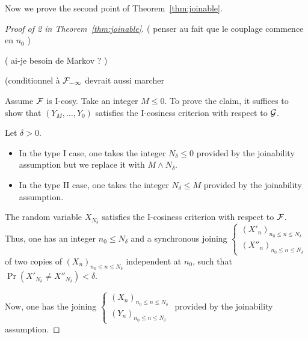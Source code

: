 \documentclass[12pt,a4paper]{article}
\begin{document}
Now we prove the second point of Theorem~\ref{thm:joinable}.

\begin{proof}[Proof of 2 in Theorem~\ref{thm:joinable}]

( penser au fait que le couplage commence en $n_0$ )

( ai-je besoin de Markov ? )

(conditionnel à $\mathcal{F}_{-\infty}$ devrait aussi marcher 

Assume $\mathcal{F}$ is I-cosy. Take an integer $M \leq 0$. 
To prove the claim, it suffices to show that $(Y_M, \ldots, Y_0)$ 
satisfies the I-cosiness criterion with respect to $\mathcal{G}$. 

Let $\delta>0$. 
\begin{itemize}
\item In the type I case, one takes the integer $N_\delta \leq 0$ provided by the 
joinability assumption but we replace it with $M \wedge N_\delta$. 

\item In the type II case, one takes the integer $N_\delta \leq M$ provided by the 
joinability assumption. 
\end{itemize}

The random variable $X_{N_\delta}$ satisfies the I-cosiness criterion 
with respect to $\mathcal{F}$. Thus, one has an integer $n_0 \leq N_\delta$ and  
a synchronous joining 
$\left\{\begin{smallmatrix} {(X'_n)}_{n_0 \leq n \leq N_\delta} \\ 
{(X''_n)}_{n_0 \leq n \leq N_\delta}
\end{smallmatrix}\right.$
of two copies of ${(X_n)}_{n_0 \leq n \leq N_\delta}$ 
independent at $n_0$, such that $\Pr(X'_{N_\delta} \neq X''_{N_\delta}) < \delta$. 

Now, one has the joining 
 $\left\{\begin{smallmatrix} {(X_n)}_{n_0 \leq n \leq N_\delta} \\ 
{(Y_n)}_{n_0 \leq n \leq N_\delta}
\end{smallmatrix}\right.$ provided by the joinability assumption. 



\end{proof}
\end{document}
